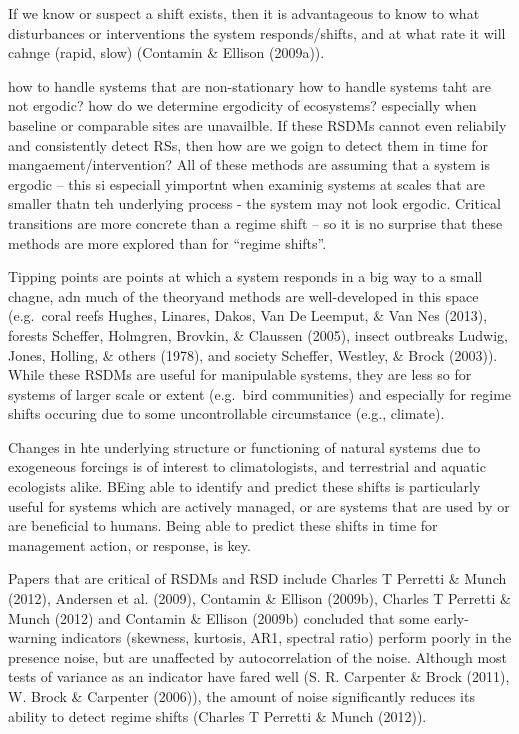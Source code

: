 \documentclass[12pt,twoside,openany]{reedthesis}
\begin{document}
If we know or suspect a shift exists, then it is advantageous to know to
what disturbances or interventions the system responds/shifts, and at
what rate it will cahnge (rapid, slow) (Contamin \& Ellison (2009a)).

how to handle systems that are non-stationary how to handle systems taht
are not ergodic? how do we determine ergodicity of ecosystems?
especially when baseline or comparable sites are unavailble. If these
RSDMs cannot even reliabily and consistently detect RSs, then how are we
goign to detect them in time for mangaement/intervention? All of these
methods are assuming that a system is ergodic -- this si especiall
yimportnt when examinig systems at scales that are smaller thatn teh
underlying process - the system may not look ergodic. Critical
transitions are more concrete than a regime shift -- so it is no
surprise that these methods are more explored than for ``regime
shifts''.

Tipping points are points at which a system responds in a big way to a
small chagne, adn much of the theoryand methods are well-developed in
this space (e.g.~coral reefs Hughes, Linares, Dakos, Van De Leemput, \&
Van Nes (2013), forests Scheffer, Holmgren, Brovkin, \& Claussen (2005),
insect outbreaks Ludwig, Jones, Holling, \& others (1978), and society
Scheffer, Westley, \& Brock (2003)). While these RSDMs are useful for
manipulable systems, they are less so for systems of larger scale or
extent (e.g.~bird communities) and especially for regime shifts occuring
due to some uncontrollable circumstance (e.g., climate).

Changes in hte underlying structure or functioning of natural systems
due to exogeneous forcings is of interest to climatologists, and
terrestrial and aquatic ecologists alike. BEing able to identify and
predict these shifts is particularly useful for systems which are
actively managed, or are systems that are used by or are beneficial to
humans. Being able to predict these shifts in time for management
action, or response, is key.

Papers that are critical of RSDMs and RSD include Charles T Perretti \&
Munch (2012), Andersen et al. (2009), Contamin \& Ellison (2009b),
Charles T Perretti \& Munch (2012) and Contamin \& Ellison (2009b)
concluded that some early-warning indicators (skewness, kurtosis, AR1,
spectral ratio) perform poorly in the presence noise, but are unaffected
by autocorrelation of the noise. Although most tests of variance as an
indicator have fared well (S. R. Carpenter \& Brock (2011), W. Brock \&
Carpenter (2006)), the amount of noise significantly reduces its ability
to detect regime shifts (Charles T Perretti \& Munch (2012)).
\end{document}
